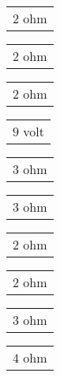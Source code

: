 \documentclass{book}
\begin{document}
\stopmpxshipout
\mpxshipout%
{\small \renewcommand{\arraystretch}{.9}
                \circuitfont\begin{tabular}{@{}l}
                   $2$ ohm 
	        \end{tabular}}%
\stopmpxshipout
\mpxshipout%
{\small \renewcommand{\arraystretch}{.9}
                \circuitfont\begin{tabular}{@{}r}
                   $2$ ohm 
	        \end{tabular}}%
\stopmpxshipout
\mpxshipout%
{\small \renewcommand{\arraystretch}{.9}
                \circuitfont\begin{tabular}[b]{@{}c}
                   $2$ ohm 
	        \end{tabular}}%
\stopmpxshipout
\mpxshipout%
{\small \renewcommand{\arraystretch}{.9}
                \circuitfont\begin{tabular}{@{}l}
                   $9$ volt 
	        \end{tabular}}%
\stopmpxshipout
\mpxshipout%
{\small \renewcommand{\arraystretch}{.9}
                \circuitfont\begin{tabular}[t]{@{}c}
                   $3$ ohm 
	        \end{tabular}}%
\stopmpxshipout
\mpxshipout%
{\small \renewcommand{\arraystretch}{.9}
                \circuitfont\begin{tabular}{@{}l}
                   $3$ ohm 
	        \end{tabular}}%
\stopmpxshipout
\mpxshipout%
{\small \renewcommand{\arraystretch}{.9}
                \circuitfont\begin{tabular}{@{}r}
                   $2$ ohm 
	        \end{tabular}}%
\stopmpxshipout
\mpxshipout%
{\small \renewcommand{\arraystretch}{.9}
                \circuitfont\begin{tabular}[b]{@{}c}
                   $2$ ohm 
	        \end{tabular}}%
\stopmpxshipout
\mpxshipout%
{\small \renewcommand{\arraystretch}{.9}
                \circuitfont\begin{tabular}[t]{@{}c}
                   $3$ ohm 
	        \end{tabular}}%
\stopmpxshipout
\mpxshipout%
{\small \renewcommand{\arraystretch}{.9}
                \circuitfont\begin{tabular}{@{}r}
                   $4$ ohm 
	        \end{tabular}}%
\end{document}
